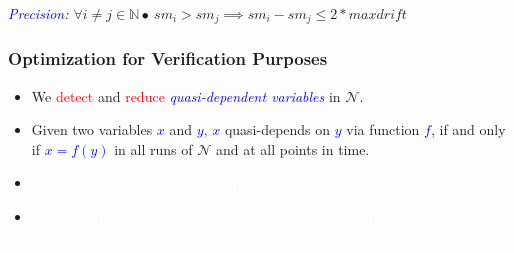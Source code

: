 \documentclass[serif]{beamer}
\begin{document}
\begin{frame}

\emph{\textcolor{blue}{Precision}: $\forall i\neq j\in\mathbb{N}\bullet \ sm_i > sm_j \implies sm_i-sm_j \leq 2*\mathit{maxdrift}$} 
\end{frame}


\begin{frame}\frametitle{\textbf{Optimization for Verification Purposes}}
\begin{itemize}
	\item We \textcolor{red}{detect} and \textcolor{red}{reduce} 
				\emph{\textcolor{blue}{quasi-dependent variables}} in $\mathcal{N}$.
	\item Given two variables \textcolor{blue}{$x$} and \textcolor{blue}{$y$}, \textcolor{blue}{$x$} quasi-depends
on \textcolor{blue}{$y$} via function \textcolor{blue}{$f$}, if and only if \textcolor{blue}{$x=f(y)$} in all 
runs of $\mathcal{N}$ and at all points in time.
	\item[] \textcolor{white}{We obtain equivalence classes of quasi-dependent variables.} 
	\item[] \textcolor{white}{We use only the representative clock of each class in a 
				\textcolor{white}{transformed network} which satisfies the same properties as
				the original network.}
\end{itemize}
\end{frame} 
\end{document}
